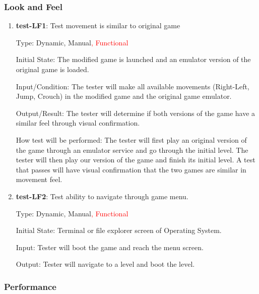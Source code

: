 \documentclass[12pt, titlepage]{article}
\begin{document}
\subsubsection{Look and Feel}


\begin{enumerate}

\item{\textbf{test-LF1}: Test movement is similar to original game\\}

Type: Dynamic, Manual\textcolor{red}{, Functional}

Initial State: The modified game is launched and an emulator version of the original game is loaded.

Input/Condition: The tester will make all available movements (Right-Left, Jump, Crouch) in the modified game and the original game emulator.

Output/Result: The tester will determine if both versions of the game have a similar feel through visual confirmation.

How test will be performed: The tester will first play an original version of the game through an emulator service and go through the initial level. The tester will then play our version of the game and finish its initial level. A test that passes will have visual confirmation that the two games are similar in movement feel.

\item{\textbf{test-LF2}: Test ability to navigate through game menu.\\}

Type: Dynamic, Manual\textcolor{red}{, Functional}

Initial State: Terminal or file explorer screen of Operating System.

Input: Tester will boot the game and reach the menu screen.

Output: Tester will navigate to a level and boot the level.


\end{enumerate}

\subsubsection{Performance}
\end{document}
